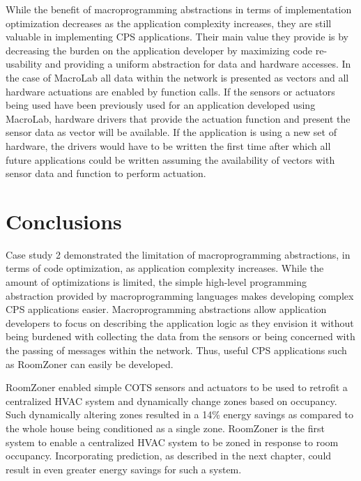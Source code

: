 While the benefit of macroprogramming abstractions in terms of implementation
optimization decreases as the application complexity increases, they are still
valuable in implementing CPS applications. Their main value they provide is by
decreasing the burden on the application developer by maximizing code
re-usability and providing a uniform abstraction for data and hardware
accesses. In the case of MacroLab all data within the network is presented as
vectors and all hardware actuations are enabled by function calls. If the
sensors or actuators being used have been previously used for an application
developed using MacroLab, hardware drivers that provide the actuation function
and present the sensor data as vector will be available. If the application is
using a new set of hardware, the drivers would have to be written the first time
after which all future applications could be written assuming the availability
of vectors with sensor data and function to perform actuation. 

\section{Conclusions}
Case study 2 demonstrated the limitation of macroprogramming abstractions, in
terms of code optimization, as application complexity increases. While the
amount of optimizations is limited, the simple high-level programming
abstraction provided by macroprogramming languages makes developing complex CPS
applications easier. Macroprogramming abstractions allow application developers
to focus on describing the application logic as they envision it without being
burdened with collecting the data from the sensors or being concerned with the
passing of messages within the network. Thus, useful CPS applications such as
RoomZoner can easily be developed.

RoomZoner enabled simple COTS sensors and actuators to be used to retrofit a
centralized HVAC system and dynamically change zones based on occupancy. Such
dynamically altering zones resulted in a 14\% energy savings as compared to the
whole house being conditioned as a single zone. RoomZoner is the first system to
enable a centralized HVAC system to be zoned in response to room
occupancy. Incorporating prediction, as described in the next chapter, could
result in even greater energy savings for such a system.


